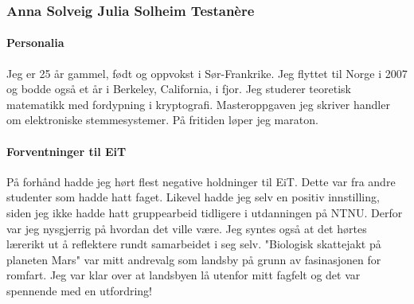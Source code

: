 \subsubsection{Anna Solveig Julia Solheim Testan\`{e}re}

\paragraph{Personalia}
Jeg er 25 år gammel, født og oppvokst i Sør-Frankrike. Jeg flyttet til Norge i 2007 og bodde også et år i Berkeley, California, i fjor.
Jeg studerer teoretisk matematikk med fordypning i kryptografi. Masteroppgaven jeg skriver handler om elektroniske stemmesystemer. På fritiden løper jeg maraton.

\paragraph{Forventninger til EiT}
På forhånd hadde jeg hørt flest negative holdninger til EiT.
Dette var fra andre studenter som hadde hatt faget.
Likevel hadde jeg selv en positiv innstilling, siden jeg ikke hadde hatt gruppearbeid tidligere i utdanningen på NTNU.
Derfor var jeg nysgjerrig på hvordan det ville være.
Jeg syntes også at det hørtes lærerikt ut å reflektere rundt samarbeidet i seg selv.
"Biologisk skattejakt på planeten Mars" var mitt andrevalg som landsby på grunn av fasinasjonen for romfart.
Jeg var klar over at landsbyen lå utenfor mitt fagfelt og det var spennende med en utfordring!